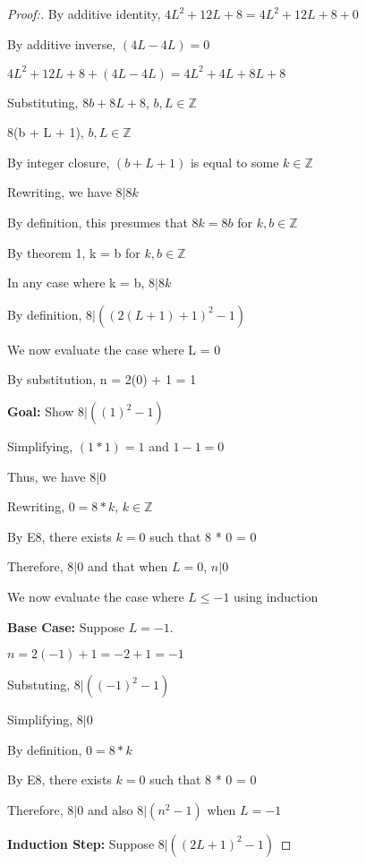\documentclass[12pt]{article}
\begin{document}
\begin{proof}[Proof:]
    By additive identity, $4L^2 + 12L + 8 = 4L^2 + 12L + 8 + 0$

    By additive inverse, $(4L - 4L) = 0$

    $4L^2 + 12L + 8 + (4L - 4L) = 4L^2 + 4L + 8L + 8$

    Substituting, $8b + 8L + 8$, $b, L \in \mathbb{Z}$

    8(b + L + 1), $b, L \in \mathbb{Z}$

    By integer closure, $(b + L + 1)$ is equal to some $ k \in \mathbb{Z}$

    Rewriting, we have $8 | 8k$

    By definition, this presumes that $8k = 8b$ for $k, b \in \mathbb{Z}$

    By theorem 1, k = b for $k, b \in \mathbb{Z}$

    In any case where k = b, $8 | 8k$

    By definition, $8 | ((2(L + 1) + 1)^2 - 1)$

    \medskip

    We now evaluate the case where L = 0

    By substitution, n = 2(0) + 1 = 1

    \textbf{Goal:} Show $8 | ((1)^2 - 1)$

    Simplifying, $(1 * 1) = 1$ and $1 - 1 = 0$

    Thus, we have $8 | 0$

    Rewriting, $0 = 8 * k$, $k \in \mathbb{Z}$

    By E8, there exists $k = 0$ such that 8 * 0 = 0

    Therefore, $8 | 0$ and that when $L = 0$, $n | 0$

    \medskip

    We now evaluate the case where $L \leq -1$ using induction

    \medskip

    \textbf{Base Case:} Suppose $L = -1$. 
    
    $n = 2(-1) + 1 = -2 + 1 = -1$
    
    Substuting, $8 | ((-1)^2 - 1)$

    Simplifying, $8 | 0$

    By definition, $0 = 8 * k$

    By E8, there exists $k = 0$ such that 8 * 0 = 0

    Therefore, $8 | 0$ and also $8 | (n^2 - 1)$ when $L = -1$

    \medskip

    \textbf{Induction Step:} Suppose $8 | ((2L+1)^2 - 1)$


\end{proof}
\end{document}
